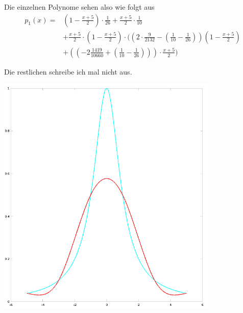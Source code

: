 \documentclass[10pt,a4paper]{article}
\begin{document}
Die einzelnen Polynome sehen also wie folgt aus
\begin{align*}
  p_{1}(x) = & (1 - \frac{x + 5}{2}) \cdot \frac{1}{26} + \frac{x + 5}{2} \cdot \frac{1}{10}\\
  & + \frac{x + 5}{2} \cdot (1 - \frac{x + 5}{2}) \cdot ((2 \cdot \frac{9}{2132} - (\frac{1}{10} - \frac{1}{26})) (1 - \frac{x + 5}{2})\\
  & + ((-2\frac{1419}{10660} + (\frac{1}{10} - \frac{1}{26}))) \cdot \frac{x + 5}{2})
\end{align*}

Die restlichen schreibe ich mal nicht aus.

\includegraphics[width=300pt]{4_13.png}
\end{document}
